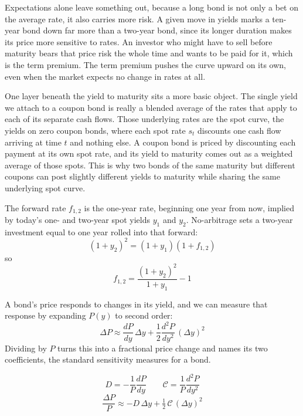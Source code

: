 Expectations alone leave something out, because a long bond is not only a bet on the average rate, it also carries more risk. A given move in yields marks a ten-year bond down far more than a two-year bond, since its longer duration makes its price more sensitive to rates. An investor who might have to sell before maturity bears that price risk the whole time and wants to be paid for it, which is the term premium. The term premium pushes the curve upward on its own, even when the market expects no change in rates at all.

One layer beneath the yield to maturity sits a more basic object. The single yield we attach to a coupon bond is really a blended average of the rates that apply to each of its separate cash flows. Those underlying rates are the spot curve, the yields on zero coupon bonds, where each spot rate $s_t$ discounts one cash flow arriving at time $t$ and nothing else. A coupon bond is priced by discounting each payment at its own spot rate, and its yield to maturity comes out as a weighted average of those spots. This is why two bonds of the same maturity but different coupons can post slightly different yields to maturity while sharing the same underlying spot curve.

\medskip

\begin{keybox}
The forward rate $f_{1,2}$ is the one-year rate, beginning one year from now, implied by today's one- and two-year spot yields $y_1$ and $y_2$. No-arbitrage sets a two-year investment equal to one year rolled into that forward:
\[
(1+y_2)^2 = (1+y_1)(1+f_{1,2})
\]
so
\[
f_{1,2} = \frac{(1+y_2)^2}{1+y_1} - 1
\]
\end{keybox}

\newpage

A bond's price responds to changes in its yield, and we can measure that response by expanding $P(y)$ to second order:
\[
\Delta P \approx \frac{dP}{dy}\,\Delta y + \frac{1}{2}\frac{d^2P}{dy^2}\,(\Delta y)^2
\]
Dividing by $P$ turns this into a fractional price change and names its two coefficients, the standard sensitivity measures for a bond.

\medskip

\begin{keybox}
\[
D = -\frac{1}{P}\frac{dP}{dy} \qquad \mathcal{C} = \frac{1}{P}\frac{d^2P}{dy^2}
\]
\[
\frac{\Delta P}{P} \approx -D\,\Delta y + \tfrac{1}{2}\,\mathcal{C}\,(\Delta y)^2
\]
\end{keybox}

